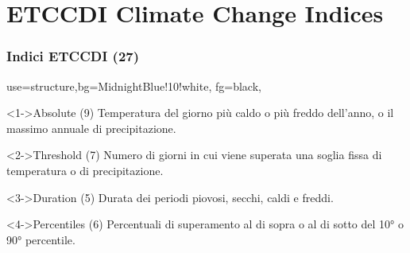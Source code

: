 \section{ETCCDI Climate Change Indices }
%

\begin{frame}
  \frametitle{Indici ETCCDI (27)}
   {use=structure,bg=MidnightBlue!10!white, fg=black,}

	\begin{block}<1->{Absolute (9)}
	  Temperatura del giorno più caldo o più freddo dell'anno, o il massimo annuale di precipitazione.
	\end{block}


	\begin{block}<2->{Threshold (7)}
    Numero di giorni in cui viene superata una soglia fissa di temperatura o di precipitazione.
  \end{block}


	\begin{block}<3->{Duration (5)}
	 Durata dei periodi piovosi, secchi, caldi e freddi.
  \end{block}
  
    \begin{block}<4->{Percentiles (6)}
     Percentuali di superamento al di sopra o al di sotto del 10° o 90° percentile. 
  \end{block}
  
  
\end{frame}
